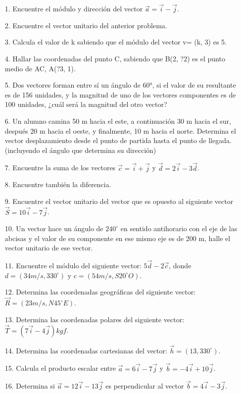 \documentclass[a5paper,pagesize,10pt,bibtotoc,pointlessnumbers,
normalheadings,DIV=9,fleqn,x11names,table,twoside=false]{scrbook}
\begin{document}
\begin{itemize}
 \item[1.] Encuentre el módulo y dirección del vector $\vec{a}= \vec{i} - \vec{j}$.
 \item[2.] Encuentre el vector unitario del anterior problema.
 \item[3.] Calcula el valor de k sabiendo que el módulo del vector v= (k, 3) es 5.
 \item[4.] Hallar las coordenadas del punto C, sabiendo que B(2, ?2) es el punto medio de AC, A(?3,
1).
 \item[5.] Dos vectores forman entre sí un ángulo de 60°, si el valor de su resultante es de 156 unidades, y la magnitud de uno de 
los vectores componentes es de 100 unidades, ¿cuál será la magnitud del otro vector?
 \item[6.]Un alumno camina 50 m hacia el este, a continuación 30 m hacia el sur, después 20 m hacia el oeste, y finalmente, 10 m 
hacia el norte. Determina el vector desplazamiento desde el punto de partida hasta el punto de llegada. (incluyendo el ángulo que 
determina su dirección)
 \item[7.] Encuentre la suma de los vectores $\vec{c}=\vec{i}+\vec{j}$ y $\vec{d}=2\vec{i}-3\vec{d}$.
 \item[8.] Encuentre también la diferencia.
 \item[9.] Encuentre el vector unitario del vector que es opuesto al siguiente vector $\vec{S} =  10\vec{i}-7\vec{j}$.
 \item[10.] Un vector hace un ángulo de $240^\circ$ en sentido antihorario con el eje de las abcisas y el valor de su componente 
en ese mismo eje es de 200 m, halle el vector unitario de ese vector.
 \item[11.] Encuentre el módulo del siguiente vector: $5\vec{d}-2\vec{c}$, donde $d=(34 m/s, 330^\circ)$ y $c = (54m/s, S20^\circ 
O)$.
 \item[12.] Determina las coordenadas geográficas del siguiente vector: $\vec{R}=(23 m/s,N45^\circ E)$.
 \item[13.] Determina las coordenadas polares del siguiente vector: $\vec{T}=(7\vec{i}-4\vec{j})kgf$.
 \item[14.] Determina las coordenadas cartesianas del vector: $\vec{h}=(13,330^\circ)$.
\item[15.] Calcula el producto escalar entre $\vec{a}=6\vec{i}-7\vec{j}$ y $\vec{b}=-4\vec{i}+10\vec{j}$.
\item[16.] Determina si $\vec{a} = 12\vec{i}-13\vec{j}$ es perpendicular al vector $\vec{b}=4\vec{i}-3\vec{j}$.

\end{itemize}
\end{document}
